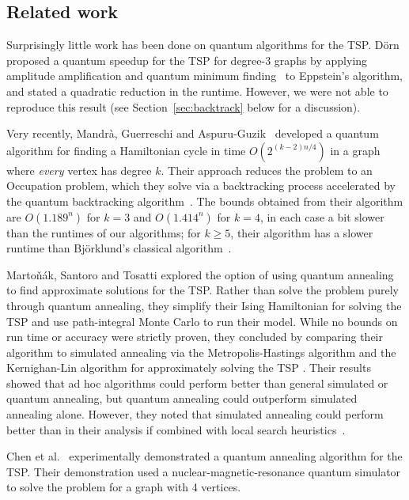 \subsection{Related work}

Surprisingly little work has been done on quantum algorithms for the TSP. D\"orn \cite{dorn2007} proposed a quantum speedup for the TSP for degree-3 graphs by applying amplitude amplification \cite{brassard1997} and quantum minimum finding~\cite{durr1996} to Eppstein's algorithm, and stated a quadratic reduction in the runtime. However, we were not able to reproduce this result (see Section~\ref{sec:backtrack} below for a discussion).

Very recently, Mandr{\`a}, Guerreschi and Aspuru-Guzik~\cite{mandra2016} developed a quantum algorithm for finding a Hamiltonian cycle in time $O(2^{(k-2)n/4})$ in a graph where {\em every} vertex has degree $k$. Their approach reduces the problem to an Occupation problem, which they solve via a backtracking process accelerated by the quantum backtracking algorithm~\cite{montanaro2015}. The bounds obtained from their algorithm are $O(1.189^n)$ for $k = 3$ and $O(1.414^n)$ for $k=4$, in each case a bit slower than the runtimes of our algorithms; for $k \ge 5$, their algorithm has a slower runtime than Bj\"orklund's classical algorithm~\cite{bjorklund14}.

Marto\v{n}\'ak, Santoro and Tosatti \cite{martonak2004} explored the option of using quantum annealing to find approximate solutions for the TSP. Rather than solve the problem purely through quantum annealing, they simplify their Ising Hamiltonian for solving the TSP and use path-integral Monte Carlo \cite{barker1979} to run their model. While no bounds on run time or accuracy were strictly proven, they concluded by comparing their algorithm to simulated annealing via the Metropolis-Hastings algorithm \cite{metropolis1953} and the Kernighan-Lin algorithm for approximately solving the TSP \cite{kernighan1970}. Their results showed that ad hoc algorithms could perform better than general simulated or quantum annealing, but quantum annealing could outperform simulated annealing alone. However, they noted that simulated annealing could perform better than in their analysis if combined with local search heuristics~\cite{martin1996}.

Chen et al.\ \cite{chen11} experimentally demonstrated a quantum annealing algorithm for the TSP. Their demonstration used a nuclear-magnetic-resonance quantum simulator to solve the problem for a graph with 4 vertices.

